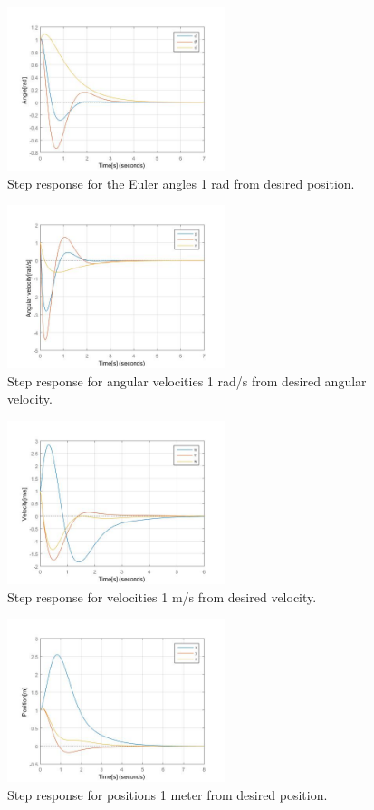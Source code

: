 \documentclass[journal]{IEEEtran}
\begin{document}
	
		\begin{figure}[H]
  			\centering
  			\includegraphics[width=2.5in]{Results/Controll/Fig1}
  			\caption{Step response for the Euler angles 1 rad from desired position.}
  			\label{fig:contresangles}
		\end{figure}	
		
		\begin{figure}[H]
  			\centering
  			\includegraphics[width=2.5in]{Results/Controll/Fig2}
  			\caption{Step response for angular velocities 1 rad/s from desired angular velocity.}
  			\label{fig:contresangvel}
		\end{figure}	

		\begin{figure}[H]
  			\centering
  			\includegraphics[width=2.5in]{Results/Controll/Fig3}
  			\caption{Step response for velocities 1 m/s from desired velocity.}
  			\label{fig:contresvel}
		\end{figure}	
		
		\begin{figure}[H]
  			\centering
  			\includegraphics[width=2.5in]{Results/Controll/Fig4}
  			\caption{Step response for positions 1 meter from desired position.}
  			\label{fig:contrespos}
		\end{figure}	
\end{document}
